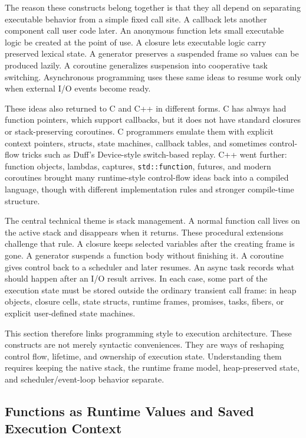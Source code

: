 \documentclass[a4paper,twoside]{report}
\begin{document}
The reason these constructs belong together is that they all depend on separating executable behavior from a simple fixed call site. A callback lets another component call user code later. An anonymous function lets small executable logic be created at the point of use. A closure lets executable logic carry preserved lexical state. A generator preserves a suspended frame so values can be produced lazily. A coroutine generalizes suspension into cooperative task switching. Asynchronous programming uses these same ideas to resume work only when external I/O events become ready.

These ideas also returned to C and C++ in different forms. C has always had function pointers, which support callbacks, but it does not have standard closures or stack-preserving coroutines. C programmers emulate them with explicit context pointers, structs, state machines, callback tables, and sometimes control-flow tricks such as Duff's Device-style switch-based replay. C++ went further: function objects, lambdas, captures, \texttt{std::function}, futures, and modern coroutines brought many runtime-style control-flow ideas back into a compiled language, though with different implementation rules and stronger compile-time structure.

The central technical theme is stack management. A normal function call lives on the active stack and disappears when it returns. These procedural extensions challenge that rule. A closure keeps selected variables after the creating frame is gone. A generator suspends a function body without finishing it. A coroutine gives control back to a scheduler and later resumes. An async task records what should happen after an I/O result arrives. In each case, some part of the execution state must be stored outside the ordinary transient call frame: in heap objects, closure cells, state structs, runtime frames, promises, tasks, fibers, or explicit user-defined state machines.

This section therefore links programming style to execution architecture. These constructs are not merely syntactic conveniences. They are ways of reshaping control flow, lifetime, and ownership of execution state. Understanding them requires keeping the native stack, the runtime frame model, heap-preserved state, and scheduler/event-loop behavior separate.

\subsection{Functions as Runtime Values and Saved Execution Context}
\end{document}
